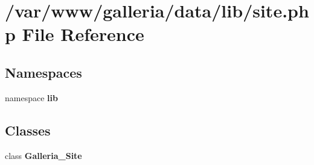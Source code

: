 \section{/var/www/galleria/data/lib/site.php File Reference}
\label{site_8php}
\subsection*{Namespaces}
\begin{CompactItemize}
\item 
namespace {\bf lib}
\end{CompactItemize}
\subsection*{Classes}
\begin{CompactItemize}
\item 
class {\bf Galleria\_\-Site}
\end{CompactItemize}
